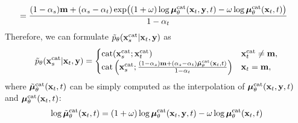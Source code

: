 \begin{rebuttal}
\begin{equation*}
\begin{aligned}
    &= \frac{(1 - \alpha_{s}) {\mathbf{m}} + (\alpha_{s} - \alpha_t) \exp\bigl( (1+\omega)\log{\bm{\mu}}_{\theta}^{{\rm cat}}({\mathbf{x}}_t, {\mathbf{y}}, t) - \omega\log{\bm{\mu}}_{\theta}^{{\rm cat}}({\mathbf{x}}_t, t)  \bigr)}{1 - \alpha_t}
    \end{aligned}
\end{equation*}
Therefore, we can formulate $\tilde{p}_{\theta}({\mathbf{x}}_{s}^{{\rm cat}} | {\mathbf{x}}_t, {\mathbf{y}})$ as
\begin{equation*}
    \tilde{p}_{\theta}({\mathbf{x}}_{s}^{{\rm cat}} | {\mathbf{x}}_t, {\mathbf{y}}) = 
    \begin{cases} 
    {\rm cat}({\mathbf{x}}_{s}^{{\rm cat}}; {\mathbf{x}}_t^{{\rm cat}}) & {\mathbf{x}}_t^{{\rm cat}} \neq {\mathbf{m}}, \\
    {\rm cat}\left( {\mathbf{x}}_{s}^{{\rm cat}}; \frac{(1 - \alpha_{s}) {\mathbf{m}} + (\alpha_{s} - \alpha_t) \tilde{{\bm{\mu}}}_{\theta}^{{\rm cat}}({\mathbf{x}}_t, t)}{1 - \alpha_t} \right) & {\mathbf{x}}_t = {\mathbf{m}},
    \end{cases}
\end{equation*}
where $\tilde{{\bm{\mu}}}_{\theta}^{{\rm cat}}({\mathbf{x}}_t, t)$ can be simply computed as the interpolation of ${\bm{\mu}}_\theta^{{\rm cat}}({\mathbf{x}}_t, {\mathbf{y}}, t)$ and ${\bm{\mu}}_\theta^{{\rm cat}}({\mathbf{x}}_t, t)$:
\begin{equation*}
    \log \tilde{{\bm{\mu}}}_{\theta}^{{\rm cat}}({\mathbf{x}}_t, t) = (1+\omega)\log{\bm{\mu}}_{\theta}^{{\rm cat}}({\mathbf{x}}_t, {\mathbf{y}}, t) - \omega\log{\bm{\mu}}_{\theta}^{{\rm cat}}({\mathbf{x}}_t, t)
\end{equation*}  
\end{rebuttal}

